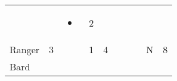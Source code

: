 \documentclass[12pt]{article}
\newcommand{\indexClass}[1]{\index{#1}}
\newcommand{\class}[1]{#1\indexClass{#1}}
\begin{document}
\begin{longtable}[]{@{}llllllllll@{}}
\begin{minipage}[t]{0.06\columnwidth}\raggedright\strut
\strut\end{minipage} &
\begin{minipage}[t]{0.06\columnwidth}\raggedright\strut
\strut\end{minipage} &
\begin{minipage}[t]{0.07\columnwidth}\raggedright\strut
\begin{itemize}
\item
\end{itemize}
\strut\end{minipage} &
\begin{minipage}[t]{0.08\columnwidth}\raggedright\strut
2
\strut\end{minipage}\tabularnewline
\begin{minipage}[t]{0.13\columnwidth}\raggedright\strut
\class{Ranger}
\strut\end{minipage} &
\begin{minipage}[t]{0.06\columnwidth}\raggedright\strut
3
\strut\end{minipage} &
\begin{minipage}[t]{0.06\columnwidth}\raggedright\strut
\strut\end{minipage} &
\begin{minipage}[t]{0.06\columnwidth}\raggedright\strut
1
\strut\end{minipage} &
\begin{minipage}[t]{0.06\columnwidth}\raggedright\strut
4
\strut\end{minipage} &
\begin{minipage}[t]{0.06\columnwidth}\raggedright\strut
\strut\end{minipage} &
\begin{minipage}[t]{0.06\columnwidth}\raggedright\strut
\strut\end{minipage} &
\begin{minipage}[t]{0.06\columnwidth}\raggedright\strut
\strut\end{minipage} &
\begin{minipage}[t]{0.07\columnwidth}\raggedright\strut
N
\strut\end{minipage} &
\begin{minipage}[t]{0.08\columnwidth}\raggedright\strut
8
\strut\end{minipage}\tabularnewline
\begin{minipage}[t]{0.13\columnwidth}\raggedright\strut
\class{Bard}
\strut\end{minipage} &

\end{longtable}
\end{document}
